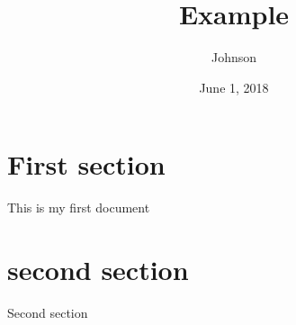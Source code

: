 \documentclass[a4paper,11pt]{article}
\begin{document}
\title{Example}
\author{Johnson}
\date{June 1, 2018}
\maketitle
\section{First section}
This is my first document
\section{second section}
Second section
\end{document}
